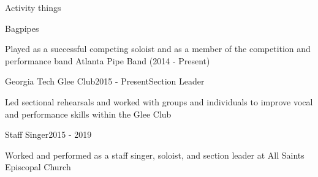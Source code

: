 \documentclass{resume} %
\begin{document}
\begin{rSection}{Activity things}

\begin{rSubsection}{Bagpipes}{}{}{}
\item Played as a successful competing soloist and as a member of the competition and performance band Atlanta Pipe Band (2014 - Present)
\end{rSubsection}
\begin{rSubsection}{Georgia Tech Glee Club}{2015 - Present}{Section Leader}{}
\item Led sectional rehearsals and worked with groups and individuals to improve vocal and performance skills within the Glee Club
\end{rSubsection}

\begin{rSubsection}{Staff Singer}{2015 - 2019}{}{}
\item Worked and performed as a staff singer, soloist, and section leader at All Saints Episcopal Church 
\end{rSubsection}
\end{rSection}
\fi
\end{document}
